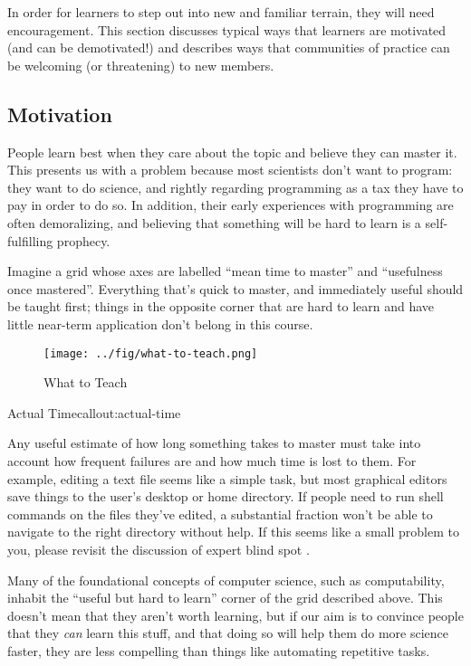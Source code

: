
In order for learners to step out into new and familiar terrain, they
will need encouragement. This section discusses typical ways that
learners are motivated (and can be demotivated!) and describes ways that
communities of practice can be welcoming (or threatening) to new
members.

\subsection{Motivation}\label{motivation}

People learn best when they care about the topic and believe they can
master it. This presents us with a problem because most scientists don't
want to program: they want to do science, and rightly regarding
programming as a tax they have to pay in order to do so. In addition,
their early experiences with programming are often demoralizing, and
believing that something will be hard to learn is a self-fulfilling
prophecy.

Imagine a grid whose axes are labelled ``mean time to master'' and
``usefulness once mastered''. Everything that's quick to master, and
immediately useful should be taught first; things in the opposite corner
that are hard to learn and have little near-term application don't
belong in this course.

\begin{figure}[htbp]
\centering
\texttt{[image: ../fig/what-to-teach.png]}
\caption{What to Teach}
\end{figure}

\begin{callout}{Actual Time}{callout:actual-time}

Any useful estimate of how long something takes to master must take into
account how frequent failures are and how much time is lost to them. For
example, editing a text file seems like a simple task, but most
graphical editors save things to the user's desktop or home directory.
If people need to run shell commands on the files they've edited, a
substantial fraction won't be able to navigate to the right directory
without help. If this seems like a small problem to you, please revisit
the discussion of expert blind spot .
\end{callout}

Many of the foundational concepts of computer science, such as
computability, inhabit the ``useful but hard to learn'' corner of the
grid described above. This doesn't mean that they aren't worth learning,
but if our aim is to convince people that they \emph{can} learn this
stuff, and that doing so will help them do more science faster, they are
less compelling than things like automating repetitive tasks.

